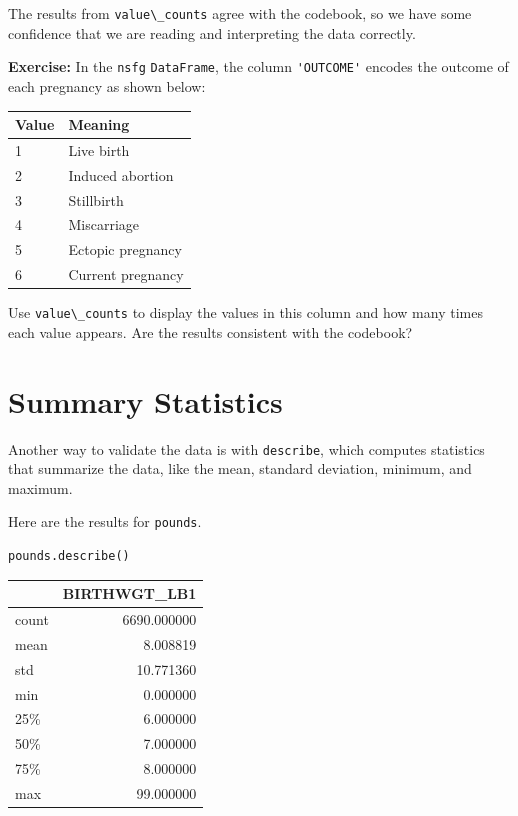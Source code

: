 The results from \passthrough{\lstinline!value\_counts!} agree with the
codebook, so we have some confidence that we are reading and
interpreting the data correctly.

\textbf{Exercise:} In the \passthrough{\lstinline!nsfg!}
\passthrough{\lstinline!DataFrame!}, the column
\passthrough{\lstinline!'OUTCOME'!} encodes the outcome of each
pregnancy as shown below:

\begin{longtable}[]{@{}ll@{}}
\midrule()
Value & Meaning \\
\midrule()
\endhead
1 & Live birth \\
2 & Induced abortion \\
3 & Stillbirth \\
4 & Miscarriage \\
5 & Ectopic pregnancy \\
6 & Current pregnancy \\
\midrule()
\end{longtable}

Use \passthrough{\lstinline!value\_counts!} to display the values in
this column and how many times each value appears. Are the results
consistent with the codebook?

\hypertarget{summary-statistics}{%
\section{Summary Statistics}\label{summary-statistics}}

Another way to validate the data is with
\passthrough{\lstinline!describe!}, which computes statistics that
summarize the data, like the mean, standard deviation, minimum, and
maximum.

Here are the results for \passthrough{\lstinline!pounds!}.

\begin{lstlisting}[]
pounds.describe()
\end{lstlisting}

\begin{tabular}{lr}
\midrule
{} &  BIRTHWGT\_LB1 \\
\midrule
count &   6690.000000 \\
mean  &      8.008819 \\
std   &     10.771360 \\
min   &      0.000000 \\
25\%   &      6.000000 \\
50\%   &      7.000000 \\
75\%   &      8.000000 \\
max   &     99.000000 \\
\midrule
\end{tabular}

